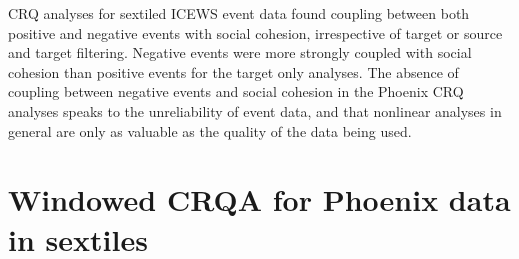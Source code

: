 \documentclass[english,man]{apa6}
\begin{document}
\begin{appendix}
CRQ analyses for sextiled ICEWS event data found coupling between both
positive and negative events with social cohesion, irrespective of
target or source and target filtering. Negative events were more
strongly coupled with social cohesion than positive events for the
target only analyses. The absence of coupling between negative events
and social cohesion in the Phoenix CRQ analyses speaks to the
unreliability of event data, and that nonlinear analyses in general are
only as valuable as the quality of the data being used.

\hypertarget{windowed-crqa-for-phoenix-data-in-sextiles}{%
\section{Windowed CRQA for Phoenix data in
sextiles}\label{windowed-crqa-for-phoenix-data-in-sextiles}}


\end{appendix}
\end{document}
